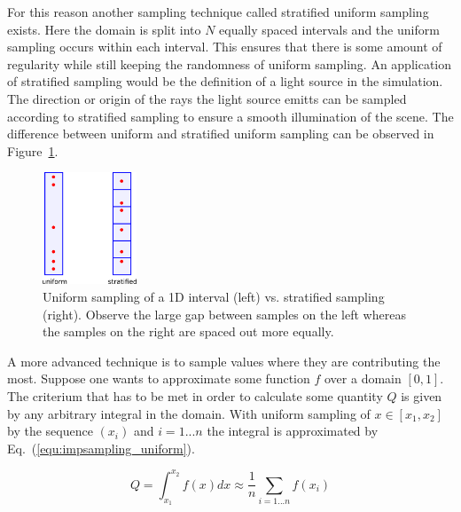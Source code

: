 \documentclass[a4paper,10pt]{article}
\newcommand{\equref}[1]{Eq.~(\ref{#1})}
\newcommand{\figref}[1]{Figure~\ref{#1}}
\begin{document}
    For this reason another sampling technique called stratified uniform
    sampling exists.
    Here the domain is split into $N$ equally spaced intervals and the
    uniform sampling occurs within each interval.
    This ensures that there is some amount of regularity while still
    keeping the randomness of uniform sampling.
    An application of stratified sampling would be the definition of
    a light source in the simulation.
    The direction or origin of the rays the light source emitts can be
    sampled according to stratified sampling to ensure a smooth
    illumination of the scene.
    The difference between uniform and stratified uniform sampling can
    be observed in \figref{fig:uniform_vs_stratified}.

    \begin{center}
        \begin{figure}
            \centering    
            \includegraphics[width=0.25\textwidth]{images/stratified.png}
            \caption{
                Uniform sampling of a 1D interval (left) vs. stratified sampling (right).
                Observe the large gap between samples on the left whereas
                the samples on the right are spaced out more equally.
            }
            \label{fig:uniform_vs_stratified}
        \end{figure}
    \end{center}

    A more advanced technique is to sample values where they are contributing
    the most.
    Suppose one wants to approximate some function $f$ over a domain
    $[0,1]$.
    The criterium that has to be met in order to calculate some quantity
    $Q$ is given by any arbitrary integral in the domain.
    With uniform sampling of $x \in [x_1,x_2]$ by the sequence 
    $(x_i)$ and $i = 1...n$ the integral is approximated
    by \equref{equ:impsampling_uniform}.

    \begin{equation}
        \label{equ:impsampling_uniform}
        Q = \int_{x_1}^{x_2} f(x) dx \approx \frac{1}{n} \sum_{i = 1...n} f(x_i)
    \end{equation}
\end{document}
